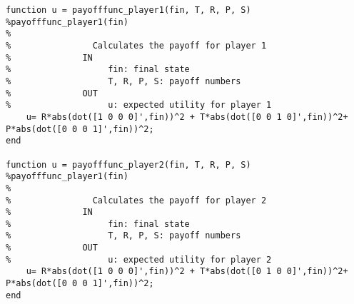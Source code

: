 \begin{lstlisting}
function u = payofffunc_player1(fin, T, R, P, S)
%payofffunc_player1(fin)
%   
%                Calculates the payoff for player 1
%              IN
%                   fin: final state
%                   T, R, P, S: payoff numbers
%              OUT
%                   u: expected utility for player 1
    u= R*abs(dot([1 0 0 0]',fin))^2 + T*abs(dot([0 0 1 0]',fin))^2+ P*abs(dot([0 0 0 1]',fin))^2;
end

function u = payofffunc_player2(fin, T, R, P, S)
%payofffunc_player1(fin)
%   
%                Calculates the payoff for player 2
%              IN
%                   fin: final state
%                   T, R, P, S: payoff numbers
%              OUT
%                   u: expected utility for player 2
    u= R*abs(dot([1 0 0 0]',fin))^2 + T*abs(dot([0 1 0 0]',fin))^2+ P*abs(dot([0 0 0 1]',fin))^2;
end

\end{lstlisting}